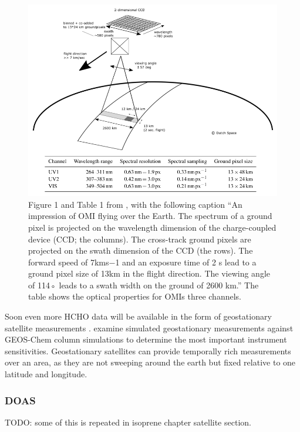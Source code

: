     \begin{figure}
      \includegraphics[width=\textwidth]{Figures/Shenkeveld_OMI_summary.png}
      \caption{ %
        Figure 1 and Table 1 from \cite{Schenkeveld2017}, with the following caption ``An impression of OMI flying over the Earth. The spectrum of a ground pixel is projected on the wavelength dimension of the charge-coupled device (CCD; the columns). The cross-track ground pixels are projected on the swath dimension of the CCD (the rows). The forward speed of 7kms−1 and an exposure time of 2 s lead to a ground pixel size of 13km in the flight direction. The viewing angle of 114◦ leads to a swath width on the ground of 2600 km.''
        The table shows the optical properties for OMIs three channels.}
      \label{LR:fig:Shenkeveld_OMI_summary}
    \end{figure}
    
    Soon even more HCHO data will be available in the form of geostationary satellite measurements \citep{Kwon2017}.
    \cite{Kwon2017} examine simulated geostationary measurements against GEOS-Chem column simulations to determine the most important instrument sensitivities.
    Geostationary satellites can provide temporally rich measurements over an area, as they are not sweeping around the earth but fixed relative to one latitude and longitude.
    
    \subsubsection{DOAS}
      TODO: some of this is repeated in isoprene chapter satellite section.
      
